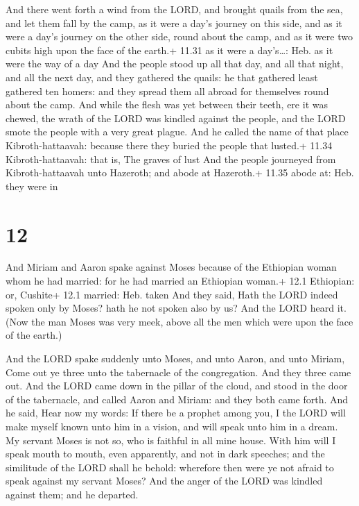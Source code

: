  And there went forth a wind from the LORD, and brought
quails from the sea, and let them fall by the camp, as it were a day's
journey on this side, and as it were a day's journey on the other side,
round about the camp, and as it were two cubits high upon the face of
the earth.+ 11.31 as it were a day's\ldots: Heb. as it were the way of a
day  And the people stood up all that day, and all that
night, and all the next day, and they gathered the quails: he that
gathered least gathered ten homers: and they spread them all abroad for
themselves round about the camp.  And while the flesh was
yet between their teeth, ere it was chewed, the wrath of the LORD was
kindled against the people, and the LORD smote the people with a very
great plague.  And he called the name of that place
Kibroth-hattaavah: because there they buried the people that lusted.+
11.34 Kibroth-hattaavah: that is, The graves of lust  And
the people journeyed from Kibroth-hattaavah unto Hazeroth; and abode at
Hazeroth.+ 11.35 abode at: Heb. they were in

\hypertarget{section-11}{%
\section{12}\label{section-11}}

 And Miriam and Aaron spake against Moses because of the
Ethiopian woman whom he had married: for he had married an Ethiopian
woman.+ 12.1 Ethiopian: or, Cushite+ 12.1 married: Heb. taken
 And they said, Hath the LORD indeed spoken only by Moses?
hath he not spoken also by us? And the LORD heard it.  (Now
the man Moses was very meek, above all the men which were upon the face
of the earth.)

 And the LORD spake suddenly unto Moses, and unto Aaron, and
unto Miriam, Come out ye three unto the tabernacle of the congregation.
And they three came out.  And the LORD came down in the
pillar of the cloud, and stood in the door of the tabernacle, and called
Aaron and Miriam: and they both came forth.  And he said,
Hear now my words: If there be a prophet among you, I the LORD will make
myself known unto him in a vision, and will speak unto him in a dream.
 My servant Moses is not so, who is faithful in all mine
house.  With him will I speak mouth to mouth, even
apparently, and not in dark speeches; and the similitude of the LORD
shall he behold: wherefore then were ye not afraid to speak against my
servant Moses?  And the anger of the LORD was kindled
against them; and he departed.

